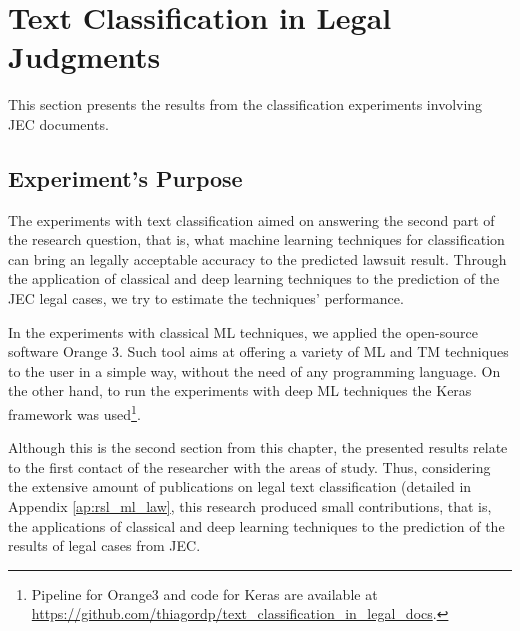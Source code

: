 \section{Text Classification in Legal Judgments}




This section presents the results from the classification experiments involving JEC documents.


\subsection{Experiment's Purpose}



The experiments with text classification aimed on answering the second part of the research question, that is, what machine learning techniques for classification can bring an legally acceptable accuracy to the predicted lawsuit result. Through the application of classical and deep learning techniques to the prediction of the JEC legal cases, we try to estimate the techniques' performance. 

In the experiments with classical ML techniques, we applied the open-source software Orange 3. Such tool aims at offering a variety of ML and TM techniques to the user in a simple way, without the need of any programming language. On the other hand, to run the experiments with deep ML techniques the Keras framework was used\footnote{Pipeline for Orange3 and code for Keras are available at \url{https://github.com/thiagordp/text_classification_in_legal_docs}.}.

Although this is the second section from this chapter, the presented results  relate to the first contact of the researcher with the areas of study. Thus, considering the extensive amount of publications on legal text classification (detailed in Appendix \ref{ap:rsl_ml_law}, this research produced small contributions, that is, the applications of classical and deep learning techniques to the prediction of the results of legal cases from JEC.

